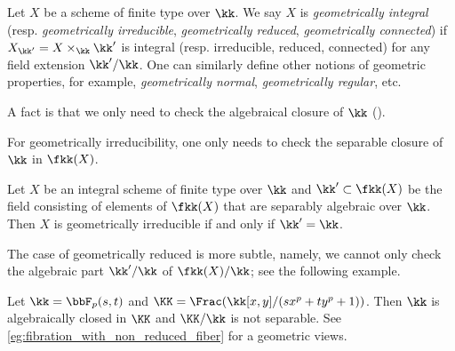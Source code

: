   \begin{definition}
    Let $X$ be a scheme of finite type over $\kk$.
    We say $X$ is \emph{geometrically integral} (resp. \emph{geometrically irreducible}, \emph{geometrically reduced}, \emph{geometrically connected}) if $X_{\kk'} = X \times_\kk \kk'$ is integral (resp. irreducible, reduced, connected) for any field extension $\kk'/\kk$.
    One can similarly define other notions of geometric properties, for example, \emph{geometrically normal}, \emph{geometrically regular}, etc.
  \end{definition}

  A fact is that we only need to check the algebraical closure of $\kk$ (\cite[\href{https://stacks.math.columbia.edu/tag/030V}{Tag 030V}, \href{https://stacks.math.columbia.edu/tag/037K}{Tag 037K} and \href{https://stacks.math.columbia.edu/tag/0FWF}{0FWF}]{Stacks}).

  For geometrically irreducibility, one only needs to check the separable closure of $\kk$ in $\fkk(X)$.

  \begin{lemma}\label{lem:geometrically_irreducible_and_separably_close_in_function_field}
    Let $X$ be an integral scheme of finite type over $\kk$ and $\kk' \subset \fkk(X)$ be the field consisting of elements of $\fkk(X)$ that are separably algebraic over $\kk$.
    Then $X$ is geometrically irreducible if and only if $\kk' = \kk$.
  \end{lemma}

  The case of geometrically reduced is more subtle, namely, we cannot only check the algebraic part $\kk'/\kk$ of $\fkk(X)/\kk$; see the following example.

  \begin{example}
    Let $\kk = \bbF_p(s,t)$ and $\KK = \Frac (\kk[x,y]/(sx^p + ty^p + 1))$.
    Then $\kk$ is algebraically closed in $\KK$ and $\KK/\kk$ is not separable.
    See \cref{eg:fibration_with_non_reduced_fiber} for a geometric views.
    \Yang{}
  \end{example}

